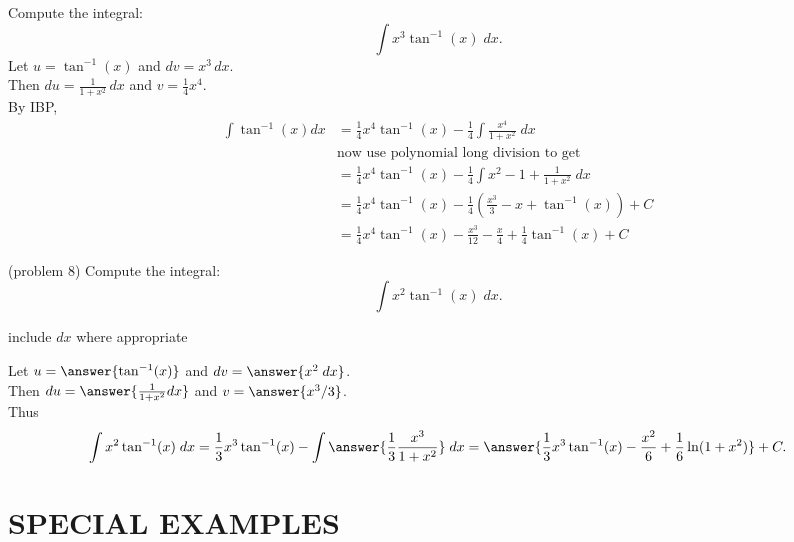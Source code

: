 \documentclass{ximera}
\begin{document}
\begin{example}[example 8]
Compute the integral:
  \[
  \int x^3\tan^{-1}(x) \;dx.
  \]
Let $u = \tan^{-1}(x)$   and   $dv = x^3 \, dx$.\\
  Then $du = \frac{1}{1+x^2}\, dx$   and   $v = \frac14 x^4$.\\
By IBP,
  \begin{align*}
  \int  \tan^{-1}(x) dx &= \frac14 x^4\tan^{-1}(x) - \frac14\int \frac{x^4}{1+x^2} \;dx\\
  & \text{now use polynomial long division to get} \\
  &= \frac14 x^4\tan^{-1}(x) - \frac14 \int x^2 - 1 + \frac{1}{1+x^2} \; dx\\
  &= \frac14 x^4\tan^{-1}(x) - \frac14\left(\frac{x^3}{3} - x + \tan^{-1}(x)\right) + C\\
  &= \frac14 x^4\tan^{-1}(x) - \frac{x^3}{12} - \frac{x}{4} + \frac14 \tan^{-1}(x) + C
  \end{align*}
  
\end{example}

\begin{problem}(problem 8)
Compute the integral:
  \[
  \int x^2\tan^{-1}(x) \;dx.
  \]
\begin{hint}
      include $dx$ where appropriate
  \end{hint}
  Let $u = \answer{\tan^{-1}(x)}$   and   $dv = \answer{x^2 \;dx}$.\\
  Then $du = \answer{\frac{1}{1+x^2} dx}$   and   $v = \answer{x^3/3}$.\\
  Thus 
  \[
  \int x^2 \tan^{-1}(x) \; dx = \frac13 x^3 \tan^{-1}(x) - \int \answer{\frac13 \frac{x^3}{1+x^2}} \;dx = 
  \answer{\frac13 x^3 \tan^{-1}(x) - \frac{x^2}{6} + \frac16\ln(1+x^2)} + C.
  \]
\end{problem}

\section{SPECIAL EXAMPLES}
\end{document}
